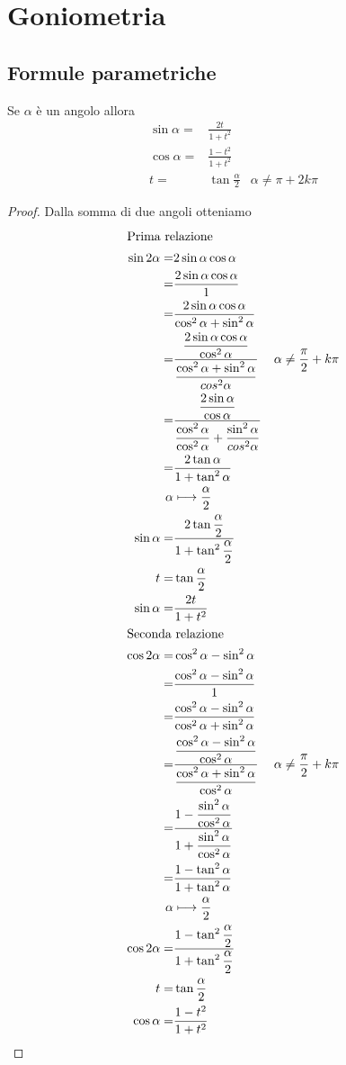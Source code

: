 \chapter{Goniometria}
\section{Formule parametriche}
\begin{thm}\label{thm:formuleparametriche1}
	Se $\alpha$ è un angolo allora
	\begin{align*}
\sin\alpha=&\frac{2t}{1+t^2}\\
\cos\alpha=&\frac{1-t^2}{1+t^2}\\
t=&\tan\frac{\alpha}{2}&\alpha\neq\pi+2k\pi
	\end{align*}
\end{thm}
\begin{proof} Dalla somma di due angoli otteniamo
	\begin{align*}
	\intertext{Prima relazione}
	\sin2\alpha=&2\sin\alpha\cos\alpha\\
	=&\frac{2\sin\alpha\cos\alpha}{1}\\
	=&\frac{2\sin\alpha\cos\alpha}{\cos^2\alpha+\sin^2\alpha}\\
	=&\dfrac{\dfrac{2\sin\alpha\cos\alpha}{\cos^2\alpha}}{\dfrac{\cos^2\alpha+\sin^2\alpha}{cos^2\alpha}}&\alpha\neq\frac{\pi}{2}+k\pi\\
	=&\dfrac{\dfrac{2\sin\alpha}{\cos\alpha}}{\dfrac{\cos^2\alpha}{\cos^2\alpha}+\dfrac{\sin^2\alpha}{cos^2\alpha}}\\
	=&\dfrac{2\tan\alpha}{1+\tan^2\alpha}\\
	\alpha&\longmapsto\dfrac{\alpha}{2}\\
	\sin\alpha=&\dfrac{2\tan\dfrac{\alpha}{2}}{1+\tan^2\dfrac{\alpha}{2}}\\
	t=&\tan\frac{\alpha}{2}\\
	\sin\alpha=&\frac{2t}{1+t^2}\\
	\intertext{Seconda relazione}
	\cos 2\alpha=&\cos^2\alpha-\sin^2\alpha\\
	=&\dfrac{\cos^2\alpha-\sin^2\alpha}{1}\\
	=&\frac{\cos^2\alpha-\sin^2\alpha}{\cos^2\alpha+\sin^2\alpha}\\
	=&\frac{\dfrac{\cos^2\alpha-\sin^2\alpha}{\cos^2\alpha}}{\dfrac{\cos^2\alpha+\sin^2\alpha}{\cos^2\alpha}}&\alpha\neq\frac{\pi}{2}+k\pi\\ 
	=&\frac{1-\dfrac{\sin^2\alpha}{\cos^2\alpha}}{1+\dfrac{\sin^2\alpha}{\cos^2\alpha}}\\
	=&\frac{1-\tan^2\alpha}{1+\tan^2\alpha}\\
	\alpha&\longmapsto\dfrac{\alpha}{2}\\
	\cos 2\alpha=&\frac{1-\tan^2\dfrac{\alpha}{2}}{1+\tan^2\dfrac{\alpha}{2}}\\
	t=&\tan\frac{\alpha}{2}\\
	\cos\alpha=&\frac{1-t^2}{1+t^2}
	\end{align*}
\end{proof}